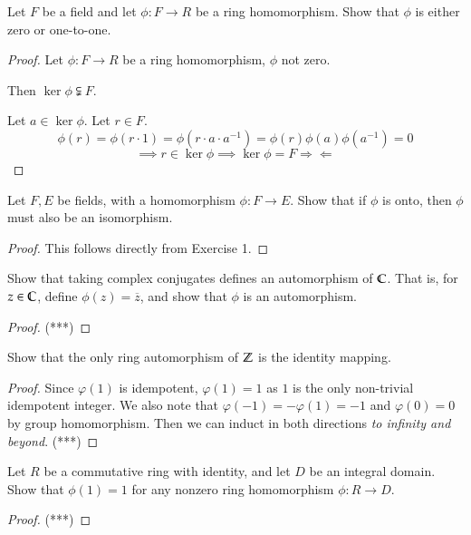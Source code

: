  Let $F$ be a field and let $\phi:F\to R$ be a ring homomorphism. Show that $\phi$ is either zero or one-to-one. 
\begin{proof}
	Let $\phi:F\to R$ be a ring homomorphism, $\phi$ not zero. 
	
	Then $\ker\phi\subsetneqq F$. 
	
	Let $a\in \ker \phi$. Let $r\in F$. 
	\[\phi(r) = \phi(r \cdot 1) = \phi(r\cdot a\cdot a^{-1}) = \phi(r)\phi(a)\phi(a^{-1}) = 0\]
	\[\implies r\in \ker\phi\implies \ker\phi = F \Rightarrow\!\Leftarrow\]
\end{proof}

 Let $F, E$ be fields, with a homomorphism $\phi: F\to E$. Show that if $\phi$ is onto, then $\phi$ must also be an isomorphism. 

\begin{proof}
	This follows directly from Exercise 1. 
\end{proof}


 Show that taking complex conjugates defines an automorphism of $\mathbb{C}$. That is, for $z\in \mathbb{C}$, define $\phi(z) = \overline{z}$, and show that $\phi$ is an automorphism. 
\begin{proof}
	(***)
\end{proof}

 Show that the only ring automorphism of $\mathbb{Z}$ is the identity mapping. 
\begin{proof}
	Since $\varphi(1)$ is idempotent, $\varphi(1) = 1$ as $1$ is the only non-trivial idempotent integer. We also note that $\varphi(-1) = -\varphi(1) = -1$ and $\varphi(0) = 0$ by group homomorphism. Then we can induct in both directions \textit{to infinity and beyond}. (***)
\end{proof}

 Let $R$ be a commutative ring with identity, and let $D$ be an integral domain. Show that $\phi(1) = 1$ for any nonzero ring homomorphism $\phi:R\to D$. 
\begin{proof}
	(***)
\end{proof}

